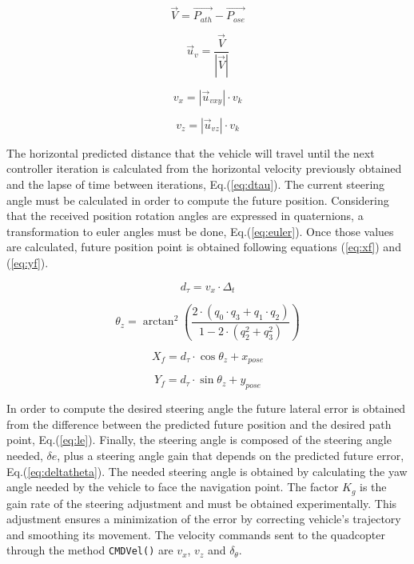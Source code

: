 \documentclass{styles/svproc}
\begin{document}
	\begin{equation}
	\vec{V} = \vec{P_{ath}} - \vec{P_{ose}}
	\label{eq:vecv}
	\end{equation}
	
	\begin{equation}
	\vec{u}_{v} = \frac{\vec{V}}{|\vec{V}|}
	\label{eq:uv}
	\end{equation}
	
	\begin{equation}
	v_{x} = |\vec{u}_{vxy}| \cdot v_{k}
	\label{eq:vxy}
	\end{equation}
	
	\begin{equation}
	v_{z} = |\vec{u}_{vz}| \cdot v_{k}
	\label{eq:vz}
	\end{equation}
	
	The horizontal predicted distance that the vehicle will travel until the next controller iteration is calculated from the horizontal velocity previously obtained and the lapse of time between iterations, Eq.(\ref{eq:dtau}). The current steering angle must be calculated
in order to compute the future position. Considering that the received position rotation angles are expressed in quaternions, a transformation to euler angles must be done, Eq.(\ref{eq:euler}). Once those values are calculated, future position point is obtained following equations (\ref{eq:xf}) and (\ref{eq:yf}).
	
	\begin{equation}
	d_{\tau} = v_{x} \cdot \Delta_{t}
	\label{eq:dtau}
	\end{equation}

	\begin{equation}
	\theta_{z} = \arctan^2 \left( \frac{2 \cdot (q_{0} \cdot q_{3} +q_{1} \cdot q_{2})}{1-2 \cdot (q_{2}^2 + q_{3}^2)}\right)
	\label{eq:euler}
	\end{equation}		
	
	\begin{equation}
	X_{f} = d_{\tau} \cdot \cos \theta_{z} + x_{pose}
	\label{eq:xf}
	\end{equation}
	
	\begin{equation}
	Y_{f} = d_{\tau} \cdot \sin \theta_{z} + y_{pose}
	\label{eq:yf}
	\end{equation}
	
	In order to compute the desired steering angle the future lateral error is obtained from the difference between the predicted future position and the desired path point, Eq.(\ref{eq:le}). Finally, the steering angle is composed of the steering angle needed, $\delta{e}$, plus a steering angle gain that depends on the predicted future error, Eq.(\ref{eq:deltatheta}). The needed steering angle is obtained by calculating the yaw angle needed by the vehicle to face the navigation point. The factor $K_{g}$ is the gain rate of the steering adjustment and must be obtained experimentally. This adjustment ensures a minimization of the error by correcting vehicle's trajectory and smoothing its movement. The velocity commands sent to the quadcopter through the method \texttt{CMDVel()} are $v_{x}$, $v_{z}$ and $\delta_{\theta}$. 
\end{document}
